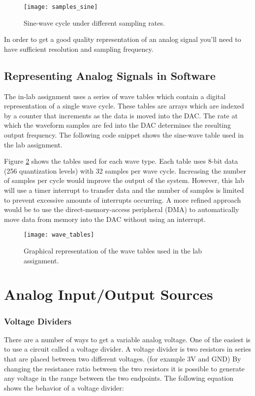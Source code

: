 \documentclass[11pt,fleqn]{book} %
\begin{document}
\begin{figure}[]
    \centering\texttt{[image: samples\_sine]}
    \caption{Sine-wave cycle under different sampling rates.}
    \label{samples_sine}
\end{figure}

 In order to get a good quality representation of an analog signal you'll need to have sufficient resolution and sampling frequency. 
 
\subsection{Representing Analog Signals in Software} 
 The in-lab assignment uses a series of wave tables which contain a digital representation of a single wave cycle. These tables are arrays which are indexed by a counter that increments as the data is moved into the DAC. The rate at which the waveform samples are fed into the DAC determines the resulting output frequency. The following code snippet shows the sine-wave table used in the lab assignment. 
 
\smallskip
 \colorbox{gray!20!white}{
     \parbox{\linewidth-2\fboxsep} {
         \centering 
         
     }
 }
 
\smallskip
 
Figure \ref{wave_tables} shows the tables used for each wave type. Each table uses 8-bit data (256 quantization levels) with 32 samples per wave cycle. Increasing the number of samples per cycle would improve the output of the system. However, this lab will use a timer interrupt to transfer data and the number of samples is limited to prevent excessive amounts of interrupts occurring. A more refined approach would be to use the direct-memory-access peripheral (DMA) to automatically move data from memory into the DAC without using an interrupt. 

\begin{figure}[]
    \centering\texttt{[image: wave\_tables]}
    \caption{Graphical representation of the wave tables used in the lab assignment.}
    \label{wave_tables}
\end{figure}
 
\section{Analog Input/Output Sources}
\subsubsection{Voltage Dividers}
There are a number of ways to get a variable analog voltage. One of the easiest is to use a circuit called a voltage divider. A voltage divider is two resistors in series that are placed between two different voltages. (for example 3V and GND) By changing the resistance ratio between the two resistors it is possible to generate any voltage in the range between the two endpoints. The following equation shows the behavior of a voltage divider:
\end{document}
